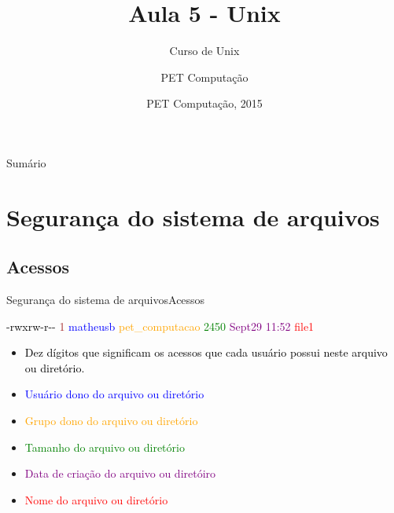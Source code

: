 \documentclass{beamer}
\title{Aula 5 - Unix}
\subtitle{Curso de Unix}
\author{PET Computa\c{c}ão}
\institute[UFSC] %
{
%
  Departamento de Informática e Estatística\\
  Universidade de Santa Catarina}
\date{PET Computa\c{c}ão, 2015}
\begin{document}
\begin{frame}
  \titlepage
\end{frame}

\begin{frame}{Sumário}
  \tableofcontents
\end{frame}

\section{Seguran\c{c}a do sistema de arquivos}

\subsection{Acessos}

\begin{frame}{Seguran\c{c}a do sistema de arquivos}{Acessos}
   \begin{block}{}
\textcolor{black}{-rwxrw-r-\--} \textcolor{brown}{1} \textcolor{blue}{matheusb} \textcolor{orange}{pet\_computacao} \textcolor{green}{2450} \textcolor{purple}{Sept29 11:52} \textcolor{red}{file1}
\end{block}
   \begin{itemize}
   \item {\textcolor{black}{Dez dígitos que significam os acessos que cada usuário possui neste arquivo ou diretório.}}
   \item{\textcolor{blue}{Usuário dono do arquivo ou diretório}}
  \item{\textcolor{orange}{Grupo dono do arquivo ou diretório}}
  \item{\textcolor{green}{Tamanho do arquivo ou diretório}}
  \item{\textcolor{purple}{Data de cria\c{c}ão do arquivo ou diretóiro}}
  \item{\textcolor{red}{Nome do arquivo ou diretório}}
  \end{itemize}
\end{frame}
\end{document}

